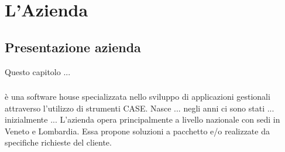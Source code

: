 

\chapter{L'Azienda}
\label{cap:introduzione}





\section{Presentazione azienda}
Questo capitolo ...

\subsection{\azienda}

\azienda è una software house specializzata nello sviluppo di applicazioni gestionali attraverso l'utilizzo di strumenti CASE. Nasce ... negli anni ci sono stati ... inizialmente ... L'azienda opera principalmente a livello nazionale con sedi in Veneto e Lombardia. Essa propone soluzioni a pacchetto e/o realizzate da specifiche richieste del cliente.

